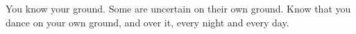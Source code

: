 

You know your ground.  Some are uncertain on their own ground.  Know
that you dance on your own ground, and over it, every night and every
day.

\bye
